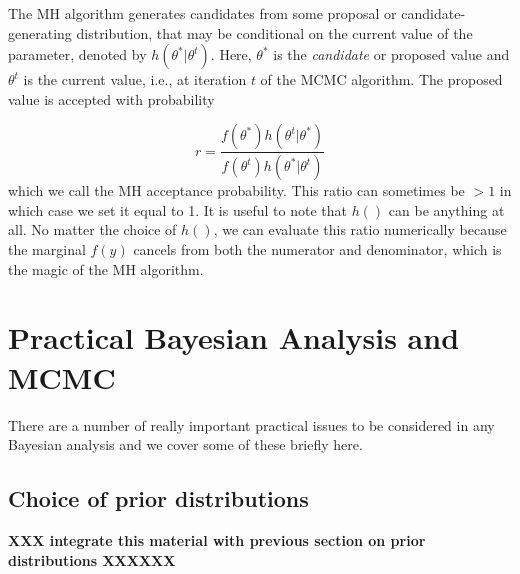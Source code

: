 The MH algorithm generates candidates from some
proposal or candidate-generating distribution, that may be conditional
on the current value of the parameter, denoted by
$h(\theta^{*}|\theta^{t})$. Here, $\theta^{*}$ is the {\it candidate}
or proposed
value and $\theta^{t}$ is the current value, i.e., at iteration $t$ of
the MCMC algorithm.  The proposed value
is accepted with probability

\[
r = \frac{ f(\theta^{*}) h(\theta^{t}|\theta^{*})}
    {f(\theta^{t}) h(\theta^{*}|\theta^{t}) }
\]
which we call the MH acceptance probability.
This ratio can sometimes be $>1$ in which case we set it equal to
1. It is useful to note that $h()$ can be anything at all. No matter
the choice of $h()$, we can evaluate this ratio numerically because
the marginal $f(y)$ cancels from both the numerator and
denominator, which is the magic of the MH algorithm.


\section{Practical Bayesian Analysis and MCMC}

There are a number of really important practical issues to be
considered in any Bayesian analysis and we cover some of these briefly
here.

\subsection{Choice of prior distributions}

{\bf XXX integrate this material with previous section on prior
distributions XXXXXX}

